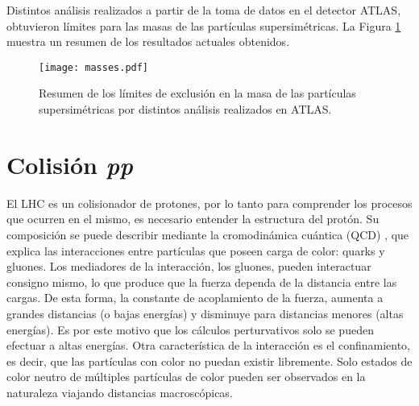 Distintos análisis realizados a partir de la toma de datos en el detector ATLAS, obtuvieron límites para las masas de las partículas supersimétricas. La Figura \ref{masses} muestra un resumen de los resultados actuales obtenidos.

\begin{figure}[ht]
\centering
\texttt{[image: masses.pdf]}
\caption{Resumen de los límites de exclusión en la masa de las partículas supersimétricas por distintos análisis realizados en ATLAS. \cite{mases_web}}
\label{masses}
\end{figure}



\section{Colisión \textit{pp}}

El LHC es un colisionador de protones, por lo tanto para comprender los procesos que ocurren en el mismo, es necesario entender la estructura del protón. Su composición se puede describir mediante la cromodinámica cuántica (QCD) \cite{ellis1996}, que explica las interacciones entre partículas que poseen carga de color: quarks y gluones. Los mediadores de la interacción, los gluones, pueden interactuar consigno mismo, lo que produce que la fuerza dependa de la distancia entre las cargas. De esta forma, la constante de acoplamiento de la fuerza, aumenta a grandes distancias (o bajas energías) y disminuye para distancias menores (altas energías). Es por este motivo que los cálculos perturvativos solo se pueden efectuar a altas energías. Otra característica de la interacción es el confinamiento, es decir, que las partículas con color no puedan existir libremente. Solo estados de color neutro de múltiples partículas de color pueden ser observados en la naturaleza viajando distancias macroscópicas.

